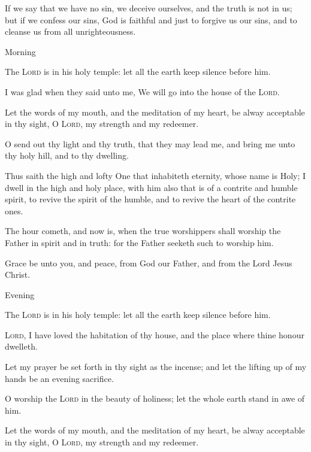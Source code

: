 \begin{multicols}{2}
    If we say that we have no sin, we deceive ourselves, and the truth is not in us; but if we confess our sins, God is faithful and just to forgive us our sins, and to cleanse us from all unrighteousness.
\begin{inhead}
Morning
\end{inhead}\noindent
    The \textsc{Lord} is in his holy temple: let all the earth keep silence before him.\par
    I was glad when they said unto me, We will go into the house of the \textsc{Lord}.\par
    Let the words of my mouth, and the meditation of my heart, be alway acceptable in thy sight, O \textsc{Lord}, my strength and my redeemer.\par
    O send out thy light and thy truth, that they may lead me, and bring me unto thy holy hill, and to thy dwelling.\par
    Thus saith the high and lofty One that inhabiteth eternity, whose name is Holy; I dwell in the high and holy place, with him also that is of a contrite and humble spirit, to revive the spirit of the humble, and to revive the heart of the contrite ones.\par
    The hour cometh, and now is, when the true worshippers shall worship the Father in spirit and in truth: for the Father seeketh such to worship him.\par
    Grace be unto you, and peace, from God our Father, and from the Lord Jesus Christ.\par
\begin{inhead}
Evening
\end{inhead}\noindent
    The \textsc{Lord} is in his holy temple: let all the earth keep silence before him.\par
    \textsc{Lord}, I have loved the habitation of thy house, and the place where thine honour dwelleth.\par
    Let my prayer be set forth in thy sight as the incense; and let the lifting up of my hands be an evening sacrifice.\par
    O worship the \textsc{Lord} in the beauty of holiness; let the whole earth stand in awe of him.\par
    Let the words of my mouth, and the meditation of my heart, be alway acceptable in thy sight, O \textsc{Lord}, my strength and my redeemer.\par

\end{multicols}
